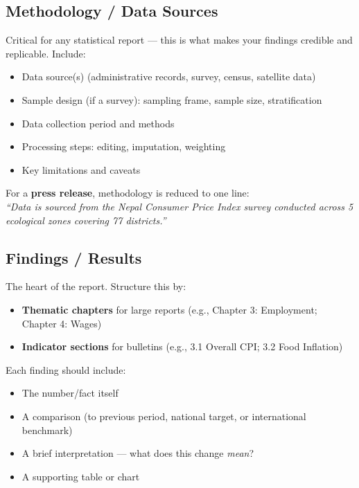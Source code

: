 \documentclass[11pt,a4paper,oneside]{book}
\begin{document}
\subsection*{Methodology / Data Sources}
Critical for any statistical report --- this is what makes your findings credible and replicable. Include:
\begin{itemize}
    \item Data source(s) (administrative records, survey, census, satellite data)
    \item Sample design (if a survey): sampling frame, sample size, stratification
    \item Data collection period and methods
    \item Processing steps: editing, imputation, weighting
    \item Key limitations and caveats
\end{itemize}

\begin{tcolorbox}[nsolightbox]
    For a \textbf{press release}, methodology is reduced to one line:\\
    \emph{``Data is sourced from the Nepal Consumer Price Index survey conducted across 5 ecological zones covering 77 districts.''}
\end{tcolorbox}

\subsection*{Findings / Results}
The heart of the report. Structure this by:
\begin{itemize}
    \item \textbf{Thematic chapters} for large reports (e.g., Chapter 3: Employment; Chapter 4: Wages)
    \item \textbf{Indicator sections} for bulletins (e.g., 3.1 Overall CPI; 3.2 Food Inflation)
\end{itemize}

Each finding should include:
\begin{itemize}
    \item The number/fact itself
    \item A comparison (to previous period, national target, or international benchmark)
    \item A brief interpretation --- what does this change \emph{mean}?
    \item A supporting table or chart
\end{itemize}
\end{document}
